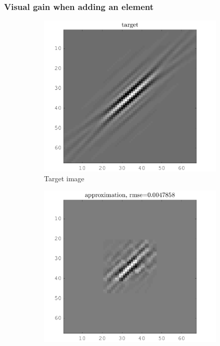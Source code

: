 \subsubsection{Visual gain when adding an element}

\begin{figure}[!ht]\centering
\begin{subfigure}[b]{0.32\textwidth}\centering
\includegraphics[width=\textwidth]{figures/before_after/xp_128x128_sc2_angl1_K3_S3_node4before_target.png}
	\caption{Target image}
\end{subfigure}
\begin{subfigure}[b]{0.32\textwidth}\centering
\includegraphics[width=\textwidth]{figures/before_after/xp_128x128_sc2_angl1_K3_S3_node4before_approx.png}

\end{subfigure}
\end{figure}
